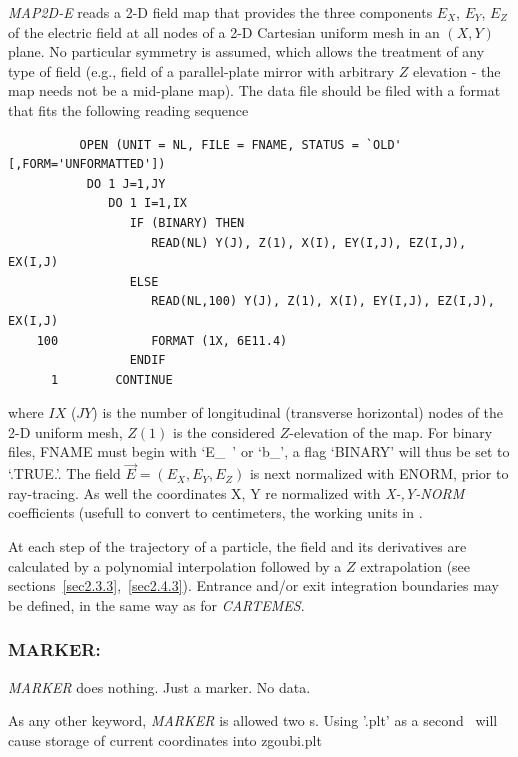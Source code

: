 \textsl{MAP2D-E} reads a 2-D field map that provides the three
components $ E_X$, $ E_Y $, $ E_Z $ of the electric field at all nodes of a 2-D Cartesian 
uniform mesh in an $(X,Y)$ plane. 
No particular symmetry is assumed, which allows the 
treatment of any type of field (e.g.,  field of a parallel-plate mirror with arbitrary $Z$ elevation 
- the map needs not be a mid-plane map). The data file should be filed with a 
format that fits the following \FORTRAN reading sequence 

{\footnotesize
\begin{verbatim}
	      OPEN (UNIT = NL, FILE = FNAME, STATUS = `OLD' [,FORM='UNFORMATTED'])
	       DO 1 J=1,JY 
	          DO 1 I=1,IX
	             IF (BINARY) THEN
	                READ(NL) Y(J), Z(1), X(I), EY(I,J), EZ(I,J), EX(I,J)
	             ELSE
	                READ(NL,100) Y(J), Z(1), X(I), EY(I,J), EZ(I,J), EX(I,J)
	100             FORMAT (1X, 6E11.4)
	             ENDIF
      1        CONTINUE
\end{verbatim}}
\medskip

\noindent where $IX$ ($JY$) is the number of longitudinal (transverse horizontal) nodes of 
the 2-D uniform mesh, $Z(1) $ is the considered $Z$-elevation of the map.   For 
binary files, FNAME must begin with \mbox{`E\_ '} or  \mbox{`b\_'}, a flag  `BINARY' will thus be 
set to `.TRUE.'. The field $ \vec  E=(E_X,E_Y,E_Z )$ is next normalized with 
ENORM, prior to ray-tracing.  As well the coordinates  X, Y re normalized with 
  \textsl{X-,Y-NORM} coefficients (usefull to convert to centimeters, the working units in  \zgoubi. 


\bigskip

\noindent At each step of the trajectory of a particle, the field and its 
derivatives are calculated by a polynomial interpolation followed 
by a $ Z $ extrapolation (see sections~\ref{sec2.3.3},~\ref{sec2.4.3}). Entrance and/or 
exit integration boundaries may be defined, in the same way as for \textsl{CARTEMES}.



\newpage

\subsubsection*{MARKER: \MARKERTitl} \label{MARKER} 
\medskip

\textsl{MARKER} does nothing. Just a marker. No data. 

As any other keyword, \textsl{MARKER} is allowed two \LABEL s. Using 
 '.plt' as a second \LABEL\ will cause storage of current coordinates into zgoubi.plt 



